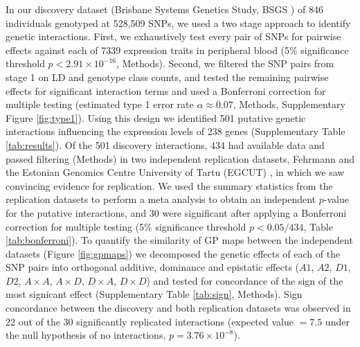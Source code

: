 \documentclass{article}
\begin{document}
In our discovery dataset (Brisbane Systems Genetics Study, BSGS \cite{Powell2012}) of 846 individuals genotyped at 528,509 SNPs, we used a two stage approach to identify genetic interactions. First, we exhaustively test every pair of SNPs for pairwise effects against each of 7339 expression traits in peripheral blood (5\% significance threshold $ p < 2.91 \times 10^{-16}$, Methods). Second, we filtered the SNP pairs from stage 1 on LD and genotype class counts, and tested the remaining pairwise effects for significant interaction terms and used a Bonferroni correction for multiple testing (estimated type 1 error rate $\alpha \approx 0.07$, Methods, Supplementary Figure \ref{fig:type1}). Using this design we identified 501 putative genetic interactions influencing the expression levels of 238 genes (Supplementary Table \ref{tab:results}). Of the 501 discovery interactions, 434 had available data and passed filtering (Methods) in two independent replication datasets, Fehrmann \cite{Fehrmann2011} and the Estonian Genomics Centre University of Tartu (EGCUT) \cite{Metspalu2004}, in which we saw convincing evidence for replication. We used the summary statistics from the replication datasets to perform a meta analysis to obtain an independent $p$-value for the putative interactions, and 30 were significant after applying a Bonferroni correction for multiple testing (5\% significance threshold $p < 0.05/434$, Table \ref{tab:bonferroni}). To quantify the similarity of GP maps between the independent datasets (Figure \ref{fig:gpmaps}) we decomposed the genetic effects of each of the SNP pairs into orthogonal additive, dominance and epistatic effects ($A1$, $A2$, $D1$, $D2$, $A \times A$, $A \times D$, $D \times A$, $D \times D$) and tested for concordance of the sign of the most signicant effect (Supplementary Table \ref{tab:sign}, Methods). Sign concordance between the discovery and both replication datasets was observed in 22 out of the 30 significantly replicated interactions (expected value $= 7.5$ under the null hypothesis of no interactions, $p = 3.76 \times 10^{-8}$).
\end{document}
